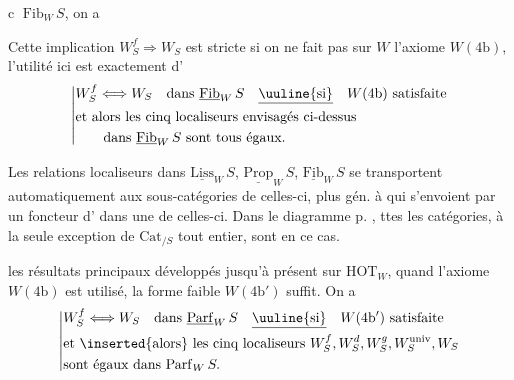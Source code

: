 \textcircled{c}  \uline{$\mathrm{Fib}$}$_W\,S$, on a

Cette implication $W_S^f\Rightarrow W_S$ est stricte si on ne fait pas
sur $W$ l'axiome $W(4\mathrm{b})$,  l'utilité ici est
exactement d'
\[
\left|\begin{aligned}
&W_S^f\Longleftrightarrow W_S\quad\text{dans }\underline{\mathrm{Fib}}_W\,S
  \quad\underline{\text{\uuline{si}}}\quad W(4\mathrm{b})\ \text{satisfaite}\\
&\text{et alors les cinq localiseurs envisagés ci-dessus}\\
&\qquad\text{dans }\underline{\mathrm{Fib}}_W\,S\text{ sont tous égaux.}
\end{aligned}\right.
\]

 Les relations  localiseurs  dans
$\underline{\mathrm{Liss}}_W\,S$, $\underline{\mathrm{Prop}}_W\,S$, $\underline{\mathrm{Fib}}_W\,S$ se transportent automatiquement aux sous-catégories de celles-ci, plus gén. à   qui s'envoient par un foncteur
d' dans une de celles-ci. Dans le diagramme
p. , ttes les catégories, à la seule exception
de $\mathrm{Cat}_{/S}$ tout entier, sont  en ce cas.

 les résultats principaux développés jusqu'à
présent sur $\mathrm{HOT}_W$, quand l'axiome $W(4\mathrm{b})$ est
utilisé, la forme faible \deleted{\unsure{(}}$W(4\mathrm{b}')$ suffit.  On a
\[
\left|\begin{aligned}
&W_S^f\Longleftrightarrow W_S\quad\text{dans }\underline{\mathrm{Parf}}_W\,S
 \quad\underline{\text{\uuline{si}}}\quad W(4\mathrm{b}')\ \text{satisfaite}\\
&\text{et \inserted{alors} les cinq localiseurs }W_S^f,W_S^d,W_S^g,W_S^{\mathrm{univ}},W_S\\
&\text{sont égaux dans }\mathrm{Parf}_W\,S .
\end{aligned}\right.
\]

